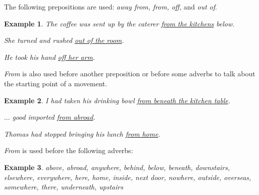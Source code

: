 \documentclass[oneside]{book}
\numberwithin{equation}{section}
\newtheorem{example}{Example}[section]
\begin{document}
%
The following prepositions are used: \textit{away from, from, off}, and \textit{out of}.
\begin{example}
    The coffee was sent up by the caterer \underline{from the kitchens} below.
    
    She turned and rushed \underline{out of the room}.
    
    He took his hand \underline{off her arm}.
\end{example}
%
\noindent{} \textit{From} is also used before another preposition or before some adverbs to talk about the starting point of a movement.
\begin{example}
    I had taken his drinking bowl \underline{from beneath the kitchen table}.
    
    $\ldots$ good imported \underline{from abroad}.
    
    Thomas had stopped bringing his lunch \underline{from home}.
\end{example}
\textit{From} is used before the following adverbs:
\begin{example}
    above, abroad, anywhere, behind, below, beneath, downstairs, elsewhere, everywhere, here, home, inside, next door, nowhere, outside, overseas, somewhere, there, underneath, upstairs
\end{example}
\end{document}
